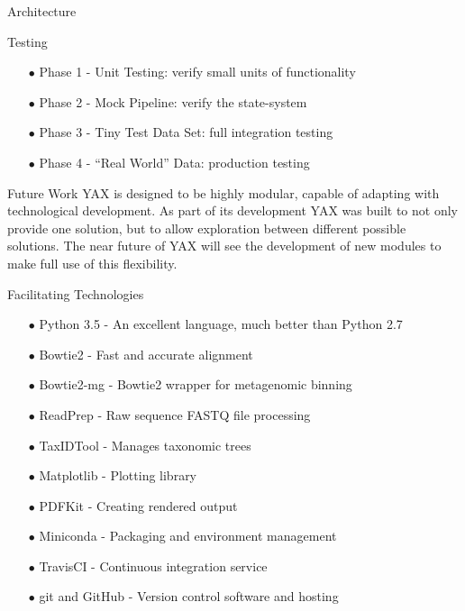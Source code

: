 \documentclass[final,t]{beamer}
\begin{document}
\begin{frame}{}
\begin{columns}[t]
\begin{column}{.3\linewidth}
\begin{block}{Architecture}
        \end{block}
        \begin{block}{Testing}
            \begin{itemize}
                \item[$\bullet$]Phase 1 - Unit Testing: verify small units of functionality
                \item[$\bullet$]Phase 2 - Mock Pipeline: verify the state-system
                \item[$\bullet$]Phase 3 - Tiny Test Data Set: full integration testing
                \item[$\bullet$]Phase 4 - ``Real World'' Data: production testing
            \end{itemize}
        \end{block}
        \begin{block}{Future Work}
            YAX is designed to be highly modular, capable of adapting with technological development. As part of its development
            YAX was built to not only provide one solution, but to allow exploration between different possible solutions.
            The near future of YAX will see the development of new modules to make full use of this flexibility.

        \end{block}
        \begin{block}{Facilitating Technologies}
        \begin{itemize}
            \item[$\bullet$]Python 3.5 - An excellent language, much better than Python 2.7
            \item[$\bullet$]Bowtie2 - Fast and accurate alignment
            \item[$\bullet$]Bowtie2-mg - Bowtie2 wrapper for metagenomic binning
            \item[$\bullet$]ReadPrep - Raw sequence FASTQ file processing
            \item[$\bullet$]TaxIDTool - Manages taxonomic trees
            \item[$\bullet$]Matplotlib - Plotting library
            \item[$\bullet$]PDFKit - Creating rendered output
            \item[$\bullet$]Miniconda - Packaging and environment management
            \item[$\bullet$]TravisCI - Continuous integration service
            \item[$\bullet$]git and GitHub - Version control software and hosting
        \end{itemize}
        \end{block}


\end{column}
\end{columns}
\end{frame}
\end{document}

